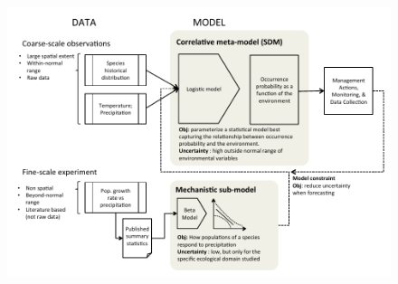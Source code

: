\documentclass[11pt]{article}
\begin{document}
\newpage
\begin{figure}[h!]
	\includegraphics{management.pdf}
	\caption{}
	\label{fig:management}
\end{figure}
\end{document}

